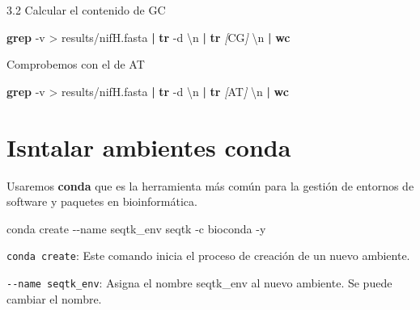 \documentclass[
]{book}
\newenvironment{Shaded}{\begin{snugshade}}{\end{snugshade}}
\newcommand{\AttributeTok}[1]{\textcolor[rgb]{0.13,0.29,0.53}{#1}}
\newcommand{\ExtensionTok}[1]{#1}
\newcommand{\FunctionTok}[1]{\textcolor[rgb]{0.13,0.29,0.53}{\textbf{#1}}}
\newcommand{\KeywordTok}[1]{\textcolor[rgb]{0.13,0.29,0.53}{\textbf{#1}}}
\newcommand{\NormalTok}[1]{#1}
\newcommand{\PreprocessorTok}[1]{\textcolor[rgb]{0.56,0.35,0.01}{\textit{#1}}}
\newcommand{\SpecialStringTok}[1]{\textcolor[rgb]{0.31,0.60,0.02}{#1}}
\newcommand{\StringTok}[1]{\textcolor[rgb]{0.31,0.60,0.02}{#1}}
\begin{document}
3.2 Calcular el contenido de GC

\begin{Shaded}
\begin{Highlighting}[]
\FunctionTok{grep} \AttributeTok{{-}v} \StringTok{\textquotesingle{}\textgreater{}\textquotesingle{}}\NormalTok{ results/nifH.fasta }\KeywordTok{|} \FunctionTok{tr} \AttributeTok{{-}d} \StringTok{\textquotesingle{}\textbackslash{}n\textquotesingle{}} \KeywordTok{|} \FunctionTok{tr} \PreprocessorTok{[}\SpecialStringTok{CG}\PreprocessorTok{]} \StringTok{\textquotesingle{}\textbackslash{}n\textquotesingle{}} \KeywordTok{|} \FunctionTok{wc}
\end{Highlighting}
\end{Shaded}

Comprobemos con el de AT

\begin{Shaded}
\begin{Highlighting}[]
\FunctionTok{grep} \AttributeTok{{-}v} \StringTok{\textquotesingle{}\textgreater{}\textquotesingle{}}\NormalTok{ results/nifH.fasta }\KeywordTok{|} \FunctionTok{tr} \AttributeTok{{-}d} \StringTok{\textquotesingle{}\textbackslash{}n\textquotesingle{}} \KeywordTok{|} \FunctionTok{tr} \PreprocessorTok{[}\SpecialStringTok{AT}\PreprocessorTok{]} \StringTok{\textquotesingle{}\textbackslash{}n\textquotesingle{}} \KeywordTok{|} \FunctionTok{wc}
\end{Highlighting}
\end{Shaded}

\section{Isntalar ambientes conda}\label{isntalar-ambientes-conda}

Usaremos \textbf{conda} que es la herramienta más común para la gestión de entornos de software y paquetes en bioinformática.

\begin{Shaded}
\begin{Highlighting}[]
\ExtensionTok{conda}\NormalTok{ create }\AttributeTok{{-}{-}name}\NormalTok{ seqtk\_env seqtk }\AttributeTok{{-}c}\NormalTok{ bioconda }\AttributeTok{{-}y}
\end{Highlighting}
\end{Shaded}

\texttt{conda\ create}: Este comando inicia el proceso de creación de un nuevo ambiente.

\texttt{-\/-name\ seqtk\_env}: Asigna el nombre seqtk\_env al nuevo ambiente. Se puede cambiar el nombre.
\end{document}
